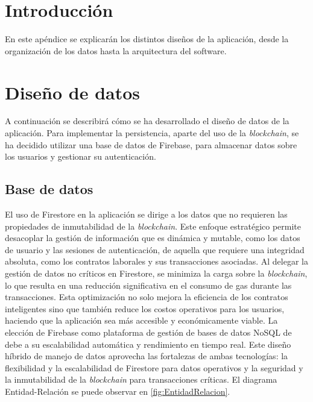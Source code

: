 
\section{Introducción}

En este apéndice se explicarán los distintos diseños de la aplicación, desde la organización de los datos hasta la arquitectura del software.

\section{Diseño de datos}

A continuación se describirá cómo se ha desarrollado el diseño de datos de la aplicación.
Para implementar la persistencia, aparte del uso de la \textit{blockchain}, se ha decidido utilizar una base de datos de Firebase, para almacenar datos sobre los usuarios y gestionar su autenticación.

\subsection{Base de datos}

El uso de Firestore en la aplicación se dirige a los datos que no requieren las propiedades de inmutabilidad de la \textit{blockchain}. Este enfoque estratégico permite desacoplar la gestión de información que es dinámica y mutable, como los datos de usuario y las sesiones de autenticación, de aquella que requiere una integridad absoluta, como los contratos laborales y sus transacciones asociadas.
Al delegar la gestión de datos no críticos en Firestore, se minimiza la carga sobre la \textit{blockchain}, lo que resulta en una reducción significativa en el consumo de gas durante las transacciones. Esta optimización no solo mejora la eficiencia de los contratos inteligentes sino que también reduce los costos operativos para los usuarios, haciendo que la aplicación sea más accesible y económicamente viable.
La elección de Firebase como plataforma de gestión de bases de datos NoSQL de debe a su escalabilidad automática y rendimiento en tiempo real.
Este diseño híbrido de manejo de datos aprovecha las fortalezas de ambas tecnologías: la flexibilidad y la escalabilidad de Firestore para datos operativos y la seguridad y la inmutabilidad de la \textit{blockchain} para transacciones críticas. 
El diagrama Entidad-Relación se puede observar en \ref{fig:EntidadRelacion}.


